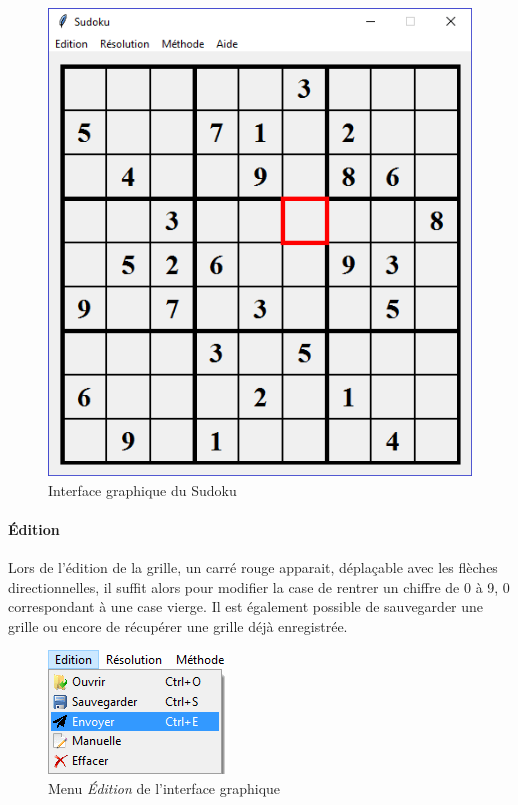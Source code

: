 \documentclass[12pt,a4paper]{report}
\begin{document}
\begin{figure}[!h]
 \center
 \includegraphics[scale=0.7]{../pictures/sudoku}
 \caption{Interface graphique du Sudoku}
 \label{Menu_edition}
\end{figure}

\paragraph{Édition} Lors de l'édition de la grille, un carré rouge apparait, déplaçable avec les flèches directionnelles, il suffit alors pour modifier la case de rentrer un chiffre de 0 à 9, 0 correspondant à une case vierge. Il est également possible de sauvegarder une grille ou encore de récupérer une grille déjà enregistrée.

\begin{figure}[!h]
 \center
 \includegraphics[scale=1.2]{../pictures/sudoku_envoyer}
 \caption{Menu \emph{Édition} de l'interface graphique}
 \label{Menu_edition}
\end{figure}
\end{document}
